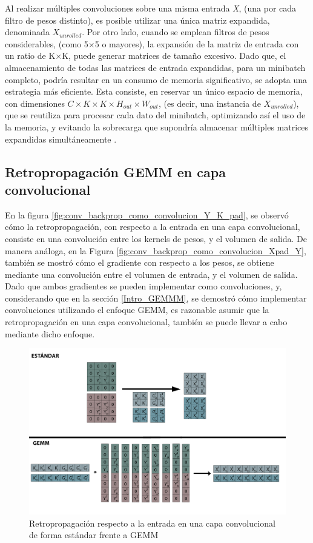 Al realizar múltiples convoluciones sobre una misma entrada \textit{X}, (una por cada filtro de pesos distinto), es posible utilizar una única matriz expandida, denominada $X_{unrolled}$. Por otro lado, cuando se emplean filtros de pesos considerables, (como 5$\times$5 o mayores), la expansión de la matriz de entrada con un ratio de K$\times$K, puede generar matrices de tamaño excesivo. Dado que, el almacenamiento de todas las matrices de entrada expandidas, para un minibatch completo, podría resultar en un consumo de memoria significativo, se adopta una estrategia más eficiente. Esta consiste, en reservar un único espacio de memoria, con dimensiones $C \times K \times K \times H_{out} \times W_{out}$, (es decir, una instancia de $X_{unrolled}$), que se reutiliza para procesar cada dato del minibatch, optimizando así el uso de la memoria, y evitando la sobrecarga que supondría almacenar múltiples matrices expandidas simultáneamente \cite{Programming_Massively}.

\subsection{Retropropagación GEMM en capa convolucional}

En la figura \ref{fig:conv_backprop_como_convolucion_Y_K_pad}, se observó cómo la retropropagación, con respecto a la entrada en una capa convolucional, consiste en una convolución entre los kernels de pesos, y el volumen de salida. De manera análoga, en la Figura \ref{fig:conv_backprop_como_convolucion_Xpad_Y}, también se mostró cómo el gradiente con respecto a los pesos, se obtiene mediante una convolución entre el volumen de entrada, y el volumen de salida. \\
Dado que ambos gradientes se pueden implementar como convoluciones, y, considerando que en la sección \ref{Intro_GEMMM}, se demostró cómo implementar convoluciones utilizando el enfoque GEMM, es razonable asumir que la retropropagación en una capa convolucional, también se puede llevar a cabo mediante dicho enfoque.

\begin{figure}[H]
	\hspace{-25mm}
	\includegraphics[scale=0.3]{imagenes/conv_std_vs_gemm_backprop.jpg}  
	\caption{Retropropagación respecto a la entrada en una capa convolucional de forma estándar frente a GEMM}
	\label{fig:conv_std_vs_gemm_backprop}
\end{figure}

